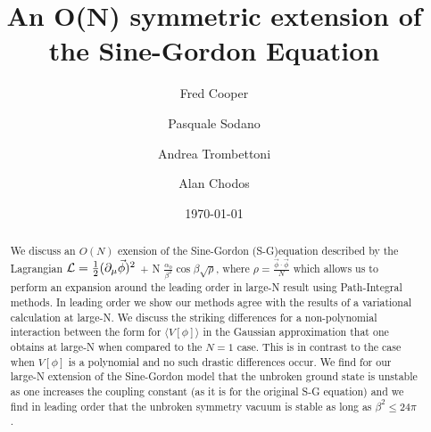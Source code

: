 \documentclass[a4paper,prd,preprint,superscriptaddress,showpacs,byrevtex]{revtex4}
\begin{document}
\title{An O(N) symmetric extension of the Sine-Gordon Equation }

\author{ Fred Cooper} 
\author{Pasquale Sodano}  
\author{Andrea Trombettoni} 
\author{Alan Chodos} 
 \date{\today}


\begin{abstract}
We discuss an $O(N)$ exension of the Sine-Gordon (S-G)equation described by
the
Lagrangian $ {\cal L} = \frac{1}{2} (\partial_\mu \vec{\phi}) ^2$ + N
$\frac{\alpha_0} {\beta^2} \cos \beta \sqrt {\rho}  $,  where $\rho = \frac
{\vec{\phi} \cdot \vec{\phi}}{N} $ which allows us to  perform an expansion
around the leading order in large-N result using Path-Integral methods.  In
leading order we show our methods agree with the results of a variational
calculation at large-N. We discuss the striking differences for a
non-polynomial interaction between the form for $\langle V[\phi] \rangle$ in
the Gaussian approximation that one obtains at  large-N when compared to the
$N=1$ case.  This is in contrast to  the case when $V[\phi]$ is a
polynomial and no such drastic differences occur. We find for our large-N
extension of the Sine-Gordon model that  the unbroken ground state is
unstable
as one increases the coupling constant (as it is for the original S-G
equation) and we find in leading order that the unbroken symmetry vacuum is
stable as long as $ \beta^2 \leq 24 \pi$.

\end{abstract}


%
\maketitle
%
\end{document}
